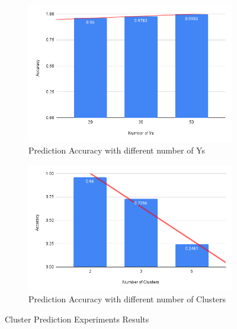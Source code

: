 \documentclass{article}
\begin{document}
\begin{figure}[h]
  \centering
  \begin{subfigure}{0.49\textwidth}
      \centering
      \includegraphics[width=\textwidth]{images/experiments/dif_ys.png}
      \caption{Prediction Accuracy with different number of Ys}
  \end{subfigure}
  \hfill
  \begin{subfigure}{0.49\textwidth}
      \centering
      \includegraphics[width=\textwidth]{images/experiments/exp_diff_clusters.png} %
      \caption{Prediction Accuracy with different number of Clusters}
  \end{subfigure}
  \caption{Cluster Prediction Experiments Results}
  \label{fig:exp_res}
\end{figure}
\end{document}
